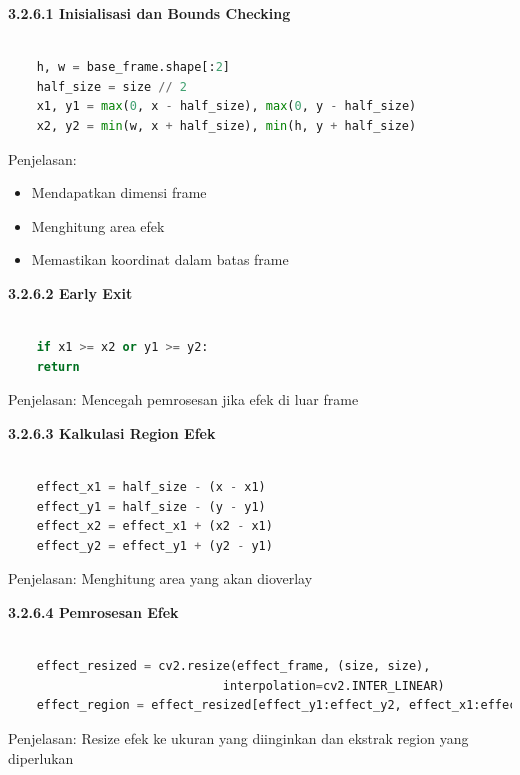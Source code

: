 \documentclass[11pt,a4paper]{article}
\begin{document}
    \noindent\textbf{3.2.6.1 Inisialisasi dan Bounds Checking}
    \begin{lstlisting}[language=Python, caption=Inisialisasi dan Bounds Checking]
        
    h, w = base_frame.shape[:2]
    half_size = size // 2
    x1, y1 = max(0, x - half_size), max(0, y - half_size)
    x2, y2 = min(w, x + half_size), min(h, y + half_size)
    \end{lstlisting}
    Penjelasan:
    \begin{itemize}
        \item Mendapatkan dimensi frame
        \item Menghitung area efek
        \item Memastikan koordinat dalam batas frame
    \end{itemize}

    \noindent\textbf{3.2.6.2 Early Exit}
    \begin{lstlisting}[language=Python, caption=Early Exit]
        
    if x1 >= x2 or y1 >= y2:
    return
    \end{lstlisting}
    Penjelasan: Mencegah pemrosesan jika efek di luar frame

    \noindent\textbf{3.2.6.3 Kalkulasi Region Efek}
    \begin{lstlisting}[language=Python, caption=Ekstraksi Koordinat]
        
    effect_x1 = half_size - (x - x1)
    effect_y1 = half_size - (y - y1)
    effect_x2 = effect_x1 + (x2 - x1)
    effect_y2 = effect_y1 + (y2 - y1)
    \end{lstlisting}
    Penjelasan: Menghitung area yang akan dioverlay

    \noindent\textbf{3.2.6.4 Pemrosesan Efek}
    \begin{lstlisting}[language=Python, caption=Pemrosesan Efek]
        
    effect_resized = cv2.resize(effect_frame, (size, size), 
                              interpolation=cv2.INTER_LINEAR)
    effect_region = effect_resized[effect_y1:effect_y2, effect_x1:effect_x2]
    \end{lstlisting}
    Penjelasan: Resize efek ke ukuran yang diinginkan dan ekstrak region yang diperlukan
\end{document}
